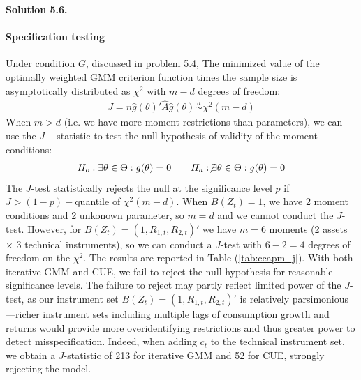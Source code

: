 \documentclass[11pt]{article}
\newenvironment{solution}[1]
    {\bigskip\noindent\textbf{Solution #1.} \par}
    {\medskip}
\begin{document}
\begin{solution}{5.6}
\paragraph{Specification testing}
Under condition $G$, discussed in problem 5.4, The minimized value of the optimally weighted GMM criterion function times the sample size is asymptotically distributed as $\chi^2$ with $m-d$ degrees of freedom:
\begin{align*}
    J = n \hat{g}(\theta)'\hat{A}\hat{g}(\theta) \overset{a}{\sim} \chi^2(m-d)
\end{align*}
When $m > d$ (i.e. we have more moment restrictions than parameters),  we can use the $J-$statistic to test the null hypothesis of validity of the moment conditions:
\begin{align*}
    H_o: \exists\theta \in \Theta: g(\theta) = 0 \qquad H_a: \not\exists\theta \in \Theta: g(\theta) = 0
\end{align*}
The $J$-test statistically rejects the null at the significance level $p$ if $J > (1-p)-$quantile of $\chi^2(m-d).$ When $B(Z_t) = 1$, we have 2 moment conditions and 2 unkonown parameter, so $m = d$ and we cannot conduct the $J$-test. However, for $B(Z_t) = (1,R_{1,t},R_{2,t})'$ we have $m = 6$ moments (2 assets $\times$ 3 technical instruments), so we can conduct a $J$-test with $6-2 = 4$ degrees of freedom on the $\chi^2.$ The results are reported in Table (\ref{tab:ccapm_j}). With both iterative GMM and CUE, we fail to reject the null hypothesis for reasonable significance levels. The failure to reject may partly reflect limited power of the $J$-test, as our instrument set $B(Z_t) = (1,R_{1,t},R_{2,t})'$ is relatively parsimonious---richer instrument sets including multiple lags of consumption growth and returns would provide more overidentifying restrictions and thus greater power to detect misspecification. Indeed, when adding $c_t$ to the technical instrument set, we obtain a $J$-statistic of 213 for iterative GMM and 52 for CUE, strongly rejecting the model.

\begin{table}[H]
    \centering
    \caption{$J$-test with $B(Z_t) = (1,R_{1,t},R_{2,t})'$}
    \label{tab:ccapm_j}
    
\end{table}



\end{solution}


\newpage
\end{document}

